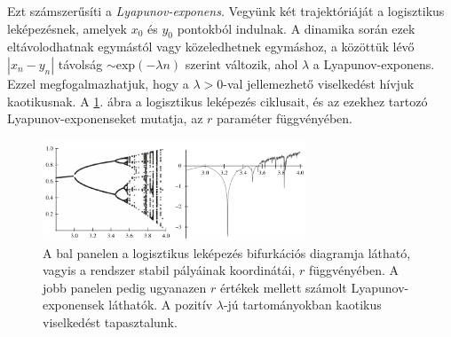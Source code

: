\documentclass[12pt]{article}
\theoremstyle{plain}
\begin{document}
Ezt számszerűsíti a {\em Lyapunov-exponens}. Vegyünk két trajektóriáját a logisztikus leképezésnek, amelyek $x_0$ és $y_0$ pontokból indulnak. A dinamika során ezek eltávolodhatnak egymástól vagy közeledhetnek egymáshoz, a közöttük lévő $|x_n - y_n|$ távolság $\sim \text{exp}(-\lambda n)$ szerint változik, ahol $\lambda$ a Lyapunov-exponens. Ezzel megfogalmazhatjuk, hogy a $\lambda > 0$-val jellemezhető viselkedést hívjuk kaotikusnak. A \ref{fig:lyap}. ábra a logisztikus leképezés ciklusait, és az ezekhez tartozó Lyapunov-exponenseket mutatja, az $r$ paraméter függvényében.

\begin{figure}[h!]
    \centering
    \includegraphics[width = 0.7\textwidth]{media/lyap.PNG}
    \caption{A bal panelen a logisztikus leképezés bifurkációs diagramja látható, vagyis a rendszer stabil pályáinak koordinátái, $r$ függvényében. A jobb panelen pedig ugyanazen $r$ értékek mellett számolt Lyapunov-exponensek láthatók. A pozitív $\lambda$-jú tartományokban kaotikus viselkedést tapasztalunk. }
    \label{fig:lyap}
\end{figure}
\newpage


\end{document}
